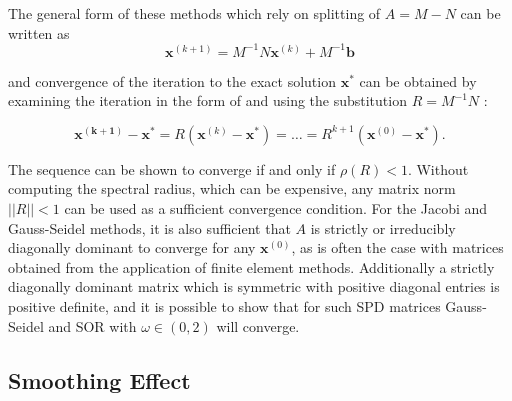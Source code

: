 
The general form of these methods which rely on splitting of $A = M - N$ can be written as
\begin{equation}
	\mathbf{x}^{(k+1)} = M^{-1}N\mathbf{x}^{(k)} + M^{-1}\mathbf{b}
\end{equation}

and convergence of the iteration to the exact solution $\mathbf{x}^*$ can be obtained by examining the iteration in the form of and using the substitution $R = M^{-1}N $ :

\begin{equation}
	\mathbf{x^{(k+1)}} - \mathbf{x}^* = R\left(\mathbf{x}^{(k)} - \mathbf{x}^* \right) = \ldots = R^{k+1}\left(\mathbf{x}^{(0)} - \mathbf{x}^* \right).
\end{equation}


The sequence can be shown to converge if and only if $\rho\left( R \right) < 1$. Without computing the spectral radius, which can be expensive, any matrix norm $|| R || < 1$ can be used as a sufficient convergence condition. For the Jacobi and Gauss-Seidel methods, it is also sufficient that $A$ is strictly or irreducibly diagonally dominant to converge for any $\mathbf{x}^{(0)}$, as is often the case with matrices obtained from the application of finite element methods. Additionally a strictly diagonally dominant matrix which is symmetric with positive diagonal entries is positive definite, and it is possible to show that for such SPD matrices Gauss-Seidel and SOR with $\omega \in (0, 2)$ will converge. %


% 

\subsection{Smoothing Effect}

